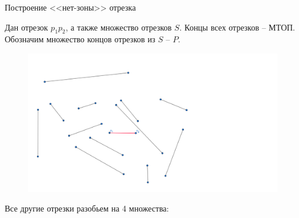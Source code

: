 \documentclass[letterpaper,12pt]{article}
\begin{document}
\begin{center}
Построение <<нет-зоны>> отрезка
\end{center}
\par
Дан отрезок $p_1 p_2$, а также множество отрезков $S$.
Концы всех отрезков -- МТОП. Обозначим множество концов отрезков
из $S$ -- $P$.
\begin{figure}[H]
      \centering
      \includegraphics[width=0.5\linewidth]{segments_def.png}
\end{figure}
Все другие отрезки разобьем на 4 множества:
\end{document}
